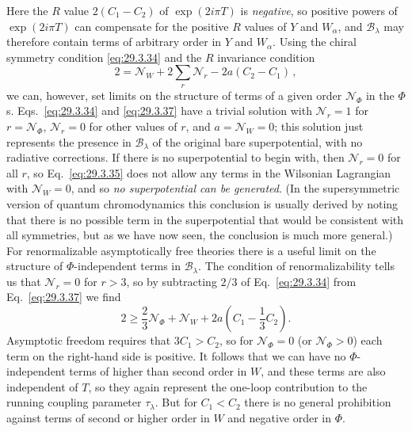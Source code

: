 Here the \(R\) value \(2(C_1-C_2)\) of \(\exp(2i\pi T)\) is
\emph{negative}, so positive powers of \(\exp(2i\pi T)\) can compensate
for the positive \(R\) values of \(Y\) and \(W_\alpha\), and
\(\mathcal{B}_\lambda\) may therefore contain terms of arbitrary order in
\(Y\) and \(W_\alpha\). Using the chiral symmetry condition
\eqref{eq:29.3.34} and the \(R\) invariance condition
\begin{equation}
  2
  =
  \mathcal{N}_W
  +2\sum_r\mathcal{N}_r
  -2a(C_2-C_1)\,,
  \tag{29.3.37}\label{eq:29.3.37}
\end{equation}
we can, however, set limits on the structure of terms of a given order
\(\mathcal{N}_\Phi\) in the \(\Phi\)s. Eqs.~\eqref{eq:29.3.34} and
\eqref{eq:29.3.37} have a trivial solution with \(\mathcal{N}_r=1\) for
\(r=\mathcal{N}_\Phi\), \(\mathcal{N}_r=0\) for other values of \(r\),
and \(a=\mathcal{N}_W=0\); this solution just represents the presence in
\(\mathcal{B}_\lambda\) of the original bare superpotential, with no
radiative corrections. If there is no superpotential to begin with, then
\(\mathcal{N}_r=0\) for all \(r\), so Eq.~\eqref{eq:29.3.35} does not
allow any terms in the Wilsonian Lagrangian with \(\mathcal{N}_W=0\), and
so \emph{no superpotential can be generated}. (In the supersymmetric
version of quantum chromodynamics this conclusion is usually derived by
noting that there is no possible term in the superpotential that would be
consistent with all symmetries, but as we have now seen, the conclusion is
much more general.) For renormalizable asymptotically free theories there
is a useful limit on the structure of \(\Phi\)-independent terms in
\(\mathcal{B}_\lambda\). The condition of renormalizability tells us that
\(\mathcal{N}_r=0\) for \(r>3\), so by subtracting \(2/3\) of
Eq.~\eqref{eq:29.3.34} from Eq.~\eqref{eq:29.3.37} we find
\begin{equation}
  2
  \geq
  \frac23\mathcal{N}_\Phi
  +\mathcal{N}_W
  +2a\left(C_1-\frac13C_2\right).
  \tag{29.3.38}\label{eq:29.3.38}
\end{equation}
Asymptotic freedom requires that \(3C_1>C_2\), so for
\(\mathcal{N}_\Phi=0\) (or \(\mathcal{N}_\Phi>0\)) each term on the
right-hand side is positive. It follows that we can have no
\(\Phi\)-independent terms of higher than second order in \(W\), and these
terms are also independent of \(T\), so they again represent the one-loop
contribution to the running coupling parameter \(\tau_\lambda\). But for
\(C_1<C_2\) there is no general prohibition against terms of second or
higher order in \(W\) and negative order in \(\Phi\).
